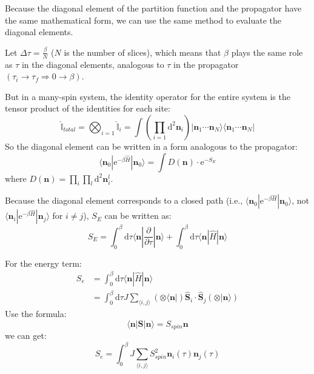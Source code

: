 Because the diagonal element of the partition function and the propagator have the same mathematical form, we can use the same method to evaluate the diagonal elements.

Let $\Delta \tau = \frac{\beta}{N}$ ($N$ is the number of slices),
which means that $\beta$ plays the same role as $\tau$ in the diagonal elements, analogous to $\tau$ in the propagator
$(\tau_i \to \tau_f \Longrightarrow 0 \to \beta)$.

But in a many-spin system, the identity operator for the entire system is the tensor product of the identities for each site:
\begin{equation}
\hat{\mathbb{I}}_{total} = \bigotimes_{i=1} \hat{\mathbb{I}}_i = \int \left( \prod_{i=1} \mathrm{d}^2 \bm{n}_i \right) | \bm{n}_1 \cdots \bm{n}_N \rangle \langle \bm{n}_1 \cdots \bm{n}_N |
\end{equation}
So the diagonal element can be written in a form analogous to the propagator:
\begin{equation}
\langle \bm{n}_0 | \mathrm{e}^{-\beta \hat{H}} | \bm{n}_0 \rangle = \int D(\bm{n}) \cdot \mathrm{e}^{-S_E}
\end{equation}
where $D(\bm{n}) = \prod_i \prod_l \mathrm{d}^2 \bm{n}_i^l$. 

Because the diagonal element corresponds to a closed path (i.e., $\langle \bm{n}_0 | \mathrm{e}^{-\beta \hat{H}} | \bm{n}_0 \rangle$, not $\langle \bm{n}_i | \mathrm{e}^{-\beta \hat{H}} | \bm{n}_j \rangle$ for $i \neq j$), $S_E$ can be written as:
\begin{equation}
S_E = \int_0^\beta \mathrm{d}\tau \langle \bm{n} | \frac{\partial}{\partial \tau} | \bm{n} \rangle + \int_0^\beta \mathrm{d}\tau \langle \bm{n} | \hat{H} | \bm{n} \rangle
\end{equation}

For the energy term:
\begin{equation}
\begin{aligned}
S_e &= \int_0^\beta \mathrm{d}\tau \langle \bm{n} | \hat{H} | \bm{n} \rangle \\
&= \int_0^\beta \mathrm{d}\tau J \sum_{\langle i,j \rangle} (\otimes \langle \bm{n} |) \hat{\bm{S}}_i 
\cdot \hat{\bm{S}}_j (\otimes | \bm{n} \rangle)
\end{aligned}
\end{equation}
Use the formula:
\begin{equation}
\langle \bm{n} | \bm{S} | \bm{n} \rangle = S_{spin} \bm{n}
\end{equation}
we can get:
\begin{equation}
S_e = \int_0^\beta J \sum_{\langle i,j \rangle} S_{spin}^2 \bm{n}_i(\tau) \bm{n}_j(\tau)
\end{equation}

